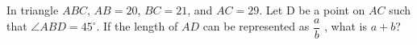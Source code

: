 In triangle $ABC$, $AB = 20$, $BC = 21$, and $AC = 29$. Let D be a point on $AC$ such that $\angle ABD = 45^\circ$. If the length of $AD$ can be represented as $\dfrac{a}{b}$ , what is $a + b$?
